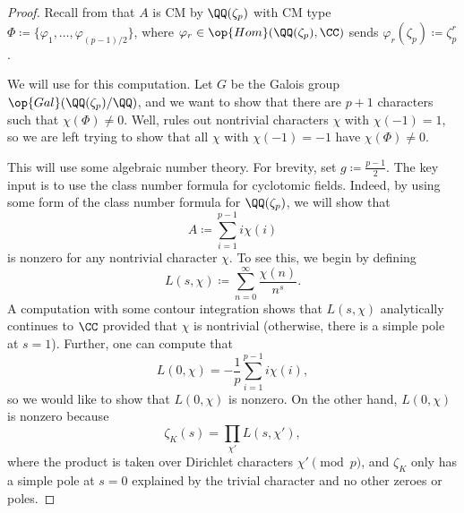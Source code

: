 \documentclass{article}
\begin{document}
\begin{proof}
	Recall from  that $A$ is CM by $\QQ(\zeta_p)$ with CM type $\Phi\coloneqq\{\varphi_1,\ldots,\varphi_{(p-1)/2}\}$, where $\varphi_r\in\op{Hom}(\QQ(\zeta_p),\CC)$ sends $\varphi_r(\zeta_p)\coloneqq\zeta_p^r$.
	
	We will use  for this computation. Let $G$ be the Galois group $\op{Gal}(\QQ(\zeta_p)/\QQ)$, and we want to show that there are $p+1$ characters such that $\chi(\Phi)\ne0$. Well,  rules out nontrivial characters $\chi$ with $\chi(-1)=1$, so we are left trying to show that all $\chi$ with $\chi(-1)=-1$ have $\chi(\Phi)\ne0$.

	This will use some algebraic number theory. For brevity, set $g\coloneqq\frac{p-1}2$. The key input is to use the class number formula for cyclotomic fields. Indeed, by using some form of the class number formula for $\QQ(\zeta_p)$, we will show that
	\[A\coloneqq\sum_{i=1}^{p-1}i\chi(i)\]
	is nonzero for any nontrivial character $\chi$. To see this, we begin by defining
	\[L(s,\chi)\coloneqq\sum_{n=0}^\infty\frac{\chi(n)}{n^s}.\]
	A computation with some contour integration shows that $L(s,\chi)$ analytically continues to $\CC$ provided that $\chi$ is nontrivial (otherwise, there is a simple pole at $s=1$). Further, one can compute that
	\[L(0,\chi)=-\frac1p\sum_{i=1}^{p-1}i\chi(i),\]
	so we would like to show that $L(0,\chi)$ is nonzero. On the other hand, $L(0,\chi)$ is nonzero because
	\[\zeta_K(s)=\prod_{\chi'}L(s,\chi'),\]
	where the product is taken over Dirichlet characters $\chi'\pmod p$, and $\zeta_K$ only has a simple pole at $s=0$ explained by the trivial character and no other zeroes or poles.
	

\end{proof}
\end{document}
